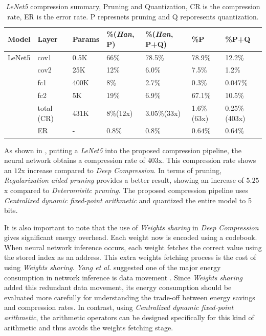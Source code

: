 \documentclass[a4paper,12pt]{report}
\begin{document}
\begin{table}[!h]
  \centering
  \begin{tabular}{lllllll}
    \hline
    Model   &Layer     &Params    &\%(\textit{Han}, P)  &\%(\textit{Han}, P+Q)  &\%P        &\%P+Q 	\\
    \hline
    LeNet5  &cov1     &0.5K       &66\%                 &78.5\%                 &78.9\%     &12.2\%\\
            &cov2     &25K        &12\%                 &6.0\%                  &7.5\%      &1.2\%\\
            &fc1      &400K       &8\%                  &2.7\%                  &0.3\%      &0.047\%\\
            &fc2      &5K         &19\%                 &6.9\%                  &67.1\%     &10.5\%\\
    \hline
            &total (CR)    &431K       &8\%(12x)             &3.05\%(33x)            &1.6\%(63x) &0.25\%(403x)\\
    \hline
            &ER       &-          &$0.8\%$               &$0.8\%$               &$0.64\%$   &$0.64\%$\\
    \hline
  \end{tabular}
  \caption{\textit{LeNet5} compression summary, Pruning and Quantization, CR is the compression
  rate, ER is the error rate. P represnets pruning and Q reporesents quantization.}
  \label{tab:comp_summary}
\end{table}

As shown in , putting a \textit{LeNet5} into the proposed
compression pipeline, the neural network obtains a compression rate of $403$x.
This compression rate shows an $12$x increase compared to \textit{Deep Compression}.
In terms of pruning, \textit{Regularization aided pruning} provides a better result,
showing an increase of $5.25$x compared to \textit{Determnisitc pruning}.
The proposed compression pipeline uses \textit{Centralized dynamic fixed-point
arithmetic} and quantized the entire model to 5 bits.

It is also important to note that the use of \textit{Weights sharing} in
\textit{Deep Compression} gives significant energy overhead.
Each weight now is encoded using a codebook.
When neural network inference occurs, each weight fetches the correct value
using the stored index as an address.
This extra weights fetching process is the cost of using \textit{Weights sharing}.
\textit{Yang et al.} suggested one of the major energy consumption in network
inference is data movement \cite{Tien}.
Since \textit{Weights sharing} added this redundant data movement, its energy
consumption should be evaluated more carefully for understanding the trade-off between
energy savings and compression rates.
In contrast, using \textit{Centralized dynamic fixed-point
arithmetic}, the arithmetic operators can be designed specifically for this kind
of arithmetic and thus avoids the weights fetching stage.
\end{document}
